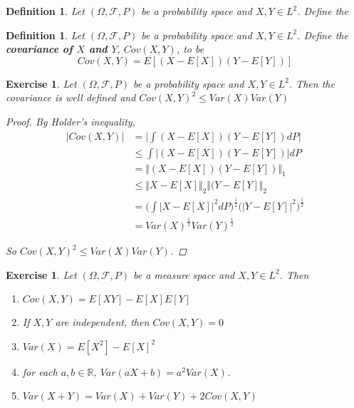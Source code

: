 \documentclass[12pt]{amsart}
\newtheorem{defn}[thm]{Definition}
\newtheorem{ex}[thm]{Exercise}
\newcommand{\Om}{\Omega}
\newcommand{\R}{\mathbb{R}}
\newcommand{\MF}{\mathcal{F}}
\newcommand{\n}{\Vert}
\begin{document}
\begin{defn}
Let $(\Om, \MF, P)$ be a probability space and $X,Y \in L^2$. Define the  
\end{defn}


\begin{defn}
Let $(\Om, \MF, P)$ be a probability space and $X,Y \in L^2$. Define the \textbf{covariance of $X$ and $Y$}, $Cov(X,Y)$, to be $$Cov(X,Y) = E[(X-E[X])(Y-E[Y])]$$
\end{defn}

\begin{ex}
Let $(\Om, \MF, P)$ be a probability space and $X,Y \in L^2$. Then the covariance is well defined and $Cov(X,Y) ^2 \leq Var(X)Var(Y)$

\begin{proof}
By Holder's inequality, 
\begin{align*}
\vert Cov(X,Y) \vert 
&= \bigg \vert \int (X-E[X])(Y-E[Y]) dP \bigg \vert \\
&\leq \int \vert (X-E[X])(Y-E[Y]) \vert dP \\
&= \n (X-E[X])(Y-E[Y]) \n_1 \\
&\leq \n X-E[X] \n_2 \n (Y-E[Y] \n_2  \\
&= \bigg(\int \vert X - E[X] \vert^2 dP\bigg)^{\frac{1}{2}} \bigg( \vert Y - E[Y] \vert^2 \bigg)^{\frac{1}{2}} \\
&= Var(X)^{\frac{1}{2}}Var(Y)^{\frac{1}{2}}
\end{align*}

So $Cov(X,Y) ^2 \leq Var(X)Var(Y)$.
\end{proof}

\end{ex}

\begin{ex}
Let $(\Om, \MF, P)$ be a measure space and $X,Y \in L^2$. Then
\begin{enumerate}
\item $Cov(X,Y) = E[XY]-E[X]E[Y]$
\item If $X,Y$ are independent, then $Cov(X,Y) = 0$
\item $Var(X) = E[X^2] - E[X]^2$
\item for each $a,b \in \R$, $Var(aX + b) = a^2Var(X)$.
\item $Var(X+Y) = Var(X) + Var(Y) + 2 Cov(X,Y)$
\end{enumerate}
\end{ex}
\end{document}
